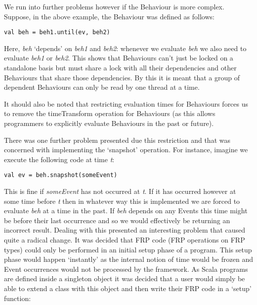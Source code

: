       We run into further problems however if the Behaviour is more complex. Suppose, in the above example,
      the Behaviour was defined as follows:

\begin{verbatim}
val beh = beh1.until(ev, beh2)
\end{verbatim}        

      Here, \emph{beh} `depends' on \emph{beh1} and \emph{beh2}: whenever we evaluate \emph{beh}
      we also need to evaluate \emph{beh1} or \emph{beh2}. This shows that Behaviours can't just
      be locked on a standalone basis but must share a lock with all their dependencies and other Behaviours
      that share those dependencies. By this it is meant that a group of dependent Behaviours can
      only be read by one thread at a time.
      
      It should also be noted that restricting evaluation times for Behaviours forces us
      to remove the timeTransform operation for Behaviours (as this allows programmers to explicitly
      evaluate Behaviours in the past or future).
      
      There was one further problem presented due this restriction and that was concerned with
      implementing the `snapshot' operation. For instance, imagine we execute the following code
      at time \emph{t}:
      
\begin{verbatim}
val ev = beh.snapshot(someEvent)
\end{verbatim}

      This is fine if \emph{someEvent} has not occurred at \emph{t}. If it has occurred however at some time
      before \emph{t} then in whatever way this is implemented we are forced to evaluate \emph{beh}
      at a time in the past. If \emph{beh} depends on any Events this time might be before their
      last occurrence and so we would effectively be returning an incorrect result. Dealing with this
      presented an interesting problem that caused quite a radical change. It was decided that FRP
      code (FRP operations on FRP types) could only be performed in an initial setup phase of a program.
      This setup phase would happen `instantly' as the internal notion of time would be frozen and Event
      occurrences would not be processed by the framework. As Scala programs are defined inside a singleton
      object it was decided that a user would simply be able to extend a class with this object and then
      write their FRP code in a `setup' function:
 
